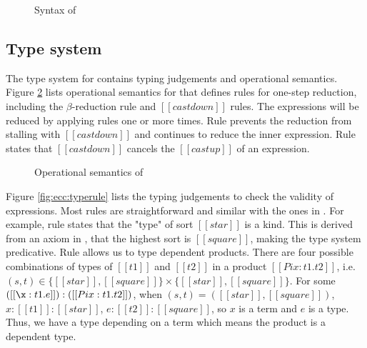 \begin{figure}[ht]
	\gram{\otte\ottinterrule
		\ottG\ottinterrule
		\ottv}
	\caption{Syntax of \name}
	\label{fig:core:syntax}
\end{figure}

\subsection{Type system}\label{sec:ecc:type}
The type system for \expcc contains typing judgements and operational semantics. Figure \ref{fig:ecc:dynsem} lists operational semantics for \expcc that defines rules for one-step reduction, including the $\beta$-reduction rule and $[[castdown]]$ rules. The expressions will be reduced by applying rules one or more times. Rule  prevents the reduction from stalling with $[[castdown]]$ and continues to reduce the inner expression. Rule  states that $[[castdown]]$ cancels the $[[castup]]$ of an expression.

\begin{figure}[ht]
	\ottdefnstep{}
	\caption{Operational semantics of \expcc}
	\label{fig:ecc:dynsem}
\end{figure}

Figure \ref{fig:ecc:typerule} lists the typing judgements to check the validity of expressions. Most rules are straightforward and similar with the ones in \cc. For example, rule  states that the "type" of sort $[[star]]$ is a kind. This is derived from an axiom in \cc, that the highest sort is $[[square]]$, making the type system predicative. Rule  allows us to type dependent products. There are four possible combinations of types of $[[t1]]$ and $[[t2]]$ in a product $[[Pi x:t1.t2]]$, i.e. $(s,t) \in \{[[star]], [[square]]\} \times \{[[star]], [[square]]\}$. For some $([[\x:t1.e]]):([[Pi x:t1.t2]])$, when $(s,t)=([[star]],[[square]])$, $x:[[t1]]:[[star]]$, $e:[[t2]]:[[square]]$, so $x$ is a term and $e$ is a type. Thus, we have a type depending on a term which means the product is a dependent type.

